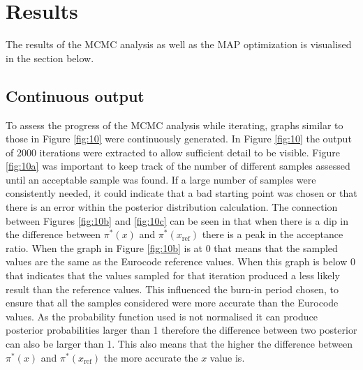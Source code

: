 \chapter{Results} \label{results}
The results of the MCMC analysis as well as the MAP optimization is visualised in the section below.
\section{Continuous output}
To assess the progress of the MCMC analysis while iterating, graphs similar to those in Figure \ref{fig:10} were continuously generated. 
In Figure \ref{fig:10} the output of 2000 iterations were extracted to allow sufficient detail to be visible.
Figure \ref{fig:10a} was important to keep track of the number of different samples assessed until an acceptable sample was found.
If a large number of samples were consistently needed, it could indicate that a bad starting point was chosen or that there is an error within the posterior distribution calculation.
The connection between Figures \ref{fig:10b} and \ref{fig:10c} can be seen in that when there is a dip in the difference between $\pi^*(x)$ and $\pi^*(x_{\text{ref}})$ there is a peak in the acceptance ratio.
When the graph in Figure \ref{fig:10b} is at 0 that means that the sampled values are the same as the Eurocode reference values.
When this graph is below 0 that indicates that the values sampled for that iteration produced a less likely result than the reference values.
This influenced the burn-in period chosen, to ensure that all the samples considered were more accurate than the Eurocode values.
As the probability function used is not normalised it can produce posterior probabilities larger than 1 therefore the difference between two posterior can also be larger than 1.
This also means that the higher the difference between $\pi^*(x)$ and $\pi^*(x_{\text{ref}})$ the more accurate the $x$ value is.

